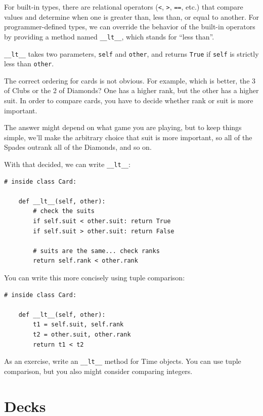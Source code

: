 \documentclass[10pt]{book}
\begin{document}
For built-in types, there are relational operators
({\tt <}, {\tt >}, {\tt ==}, etc.)
that compare
values and determine when one is greater than, less than, or equal to
another.  For programmer-defined types, we can override the behavior of
the built-in operators by providing a method named
\verb"__lt__", which stands for ``less than''.

\verb"__lt__" takes two parameters, {\tt self} and {\tt other},
and returns {\tt True} if {\tt self} is strictly less than {\tt other}.

The correct ordering for cards is not obvious.
For example, which
is better, the 3 of Clubs or the 2 of Diamonds?  One has a higher
rank, but the other has a higher suit.  In order to compare
cards, you have to decide whether rank or suit is more important.

The answer might depend on what game you are playing, but to keep
things simple, we'll make the arbitrary choice that suit is more
important, so all of the Spades outrank all of the Diamonds,
and so on.

With that decided, we can write \verb"__lt__":

\begin{verbatim}
# inside class Card:

    def __lt__(self, other):
        # check the suits
        if self.suit < other.suit: return True
        if self.suit > other.suit: return False

        # suits are the same... check ranks
        return self.rank < other.rank
\end{verbatim}
%
You can write this more concisely using tuple comparison:

\begin{verbatim}
# inside class Card:

    def __lt__(self, other):
        t1 = self.suit, self.rank
        t2 = other.suit, other.rank
        return t1 < t2
\end{verbatim}
%
As an exercise, write an \verb"__lt__" method for Time objects.  You
can use tuple comparison, but you also might consider 
comparing integers.


\section{Decks}
\end{document}
